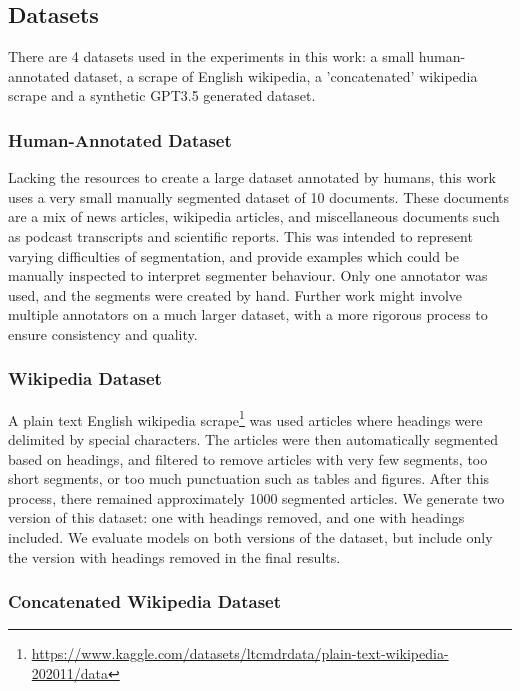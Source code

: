 \subsection{Datasets}

There are 4 datasets used in the experiments in this work: a small human-annotated dataset, a scrape of English wikipedia, a 'concatenated' wikipedia scrape and a synthetic GPT3.5 generated dataset.

\subsubsection{Human-Annotated Dataset}

Lacking the resources to create a large dataset annotated by humans, this work uses a very small manually segmented dataset of 10 documents. These documents are a mix of news articles, wikipedia articles, and miscellaneous documents such as podcast transcripts and scientific reports. This was intended to represent varying difficulties of segmentation, and provide examples which could be manually inspected to interpret segmenter behaviour. Only one annotator was used, and the segments were created by hand. Further work might involve multiple annotators on a much larger dataset, with a more rigorous process to ensure consistency and quality.

\subsubsection{Wikipedia Dataset}

A plain text English wikipedia scrape\footnote{\url{https://www.kaggle.com/datasets/ltcmdrdata/plain-text-wikipedia-202011/data}} was used articles where headings were delimited by special characters. The articles were then automatically segmented based on headings, and filtered to remove articles with very few segments, too short segments, or too much punctuation such as tables and figures. After this process, there remained approximately 1000 segmented articles. We generate two version of this dataset: one with headings removed, and one with headings included. We evaluate models on both versions of the dataset, but include only the version with headings removed in the final results.

\subsubsection{Concatenated Wikipedia Dataset}

